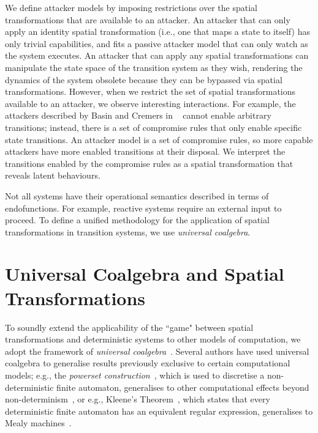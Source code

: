 We define attacker models by imposing restrictions over the spatial transformations that are available to an attacker. An attacker that can only apply an identity spatial transformation (i.e., one that maps a state to itself) has only trivial capabilities, and fits a passive attacker model that can only watch as the system executes. An attacker that can apply any spatial transformations can manipulate the state space of the transition system as they wish, rendering the dynamics of the system obsolete because they can be bypassed via spatial transformations. However, when we restrict the set of spatial transformations available to an attacker, we observe interesting interactions. For example, the attackers described by Basin and Cremers in ~\cite{KnowYourEnemy} cannot enable arbitrary transitions; instead, there is a set of
compromise rules that only enable specific state transitions. An attacker model is a set of compromise rules, so more capable attackers have more enabled transitions at their disposal. We interpret the transitions enabled by the compromise rules as a spatial transformation that reveals latent behaviours. 

Not all systems have their operational semantics described in terms of endofunctions. For example, reactive systems require an external input to proceed. To define a unified methodology for the application of spatial transformations in transition systems, we use \emph{universal coalgebra}.




\section{Universal Coalgebra and Spatial Transformations}
To soundly extend the applicability of the ``game" between spatial transformations and deterministic systems to other models of computation, we adopt the framework of \emph{universal coalgebra}~\cite{UniversalCoalgebra}.  
Several authors have used universal coalgebra to generalise results previously exclusive to certain computational models; e.g., the \emph{powerset construction}~\cite{PowersetConstruction}, which is used to discretise a non-deterministic finite automaton, generalises to other computational effects beyond non-determinism~\cite{GeneralisingDetermination}, or e.g., Kleene's Theorem~\cite{KleenesTheorem}, which states that every deterministic finite automaton has an equivalent regular expression, generalises to Mealy machines~\cite{KleeneCoalgebra}.


